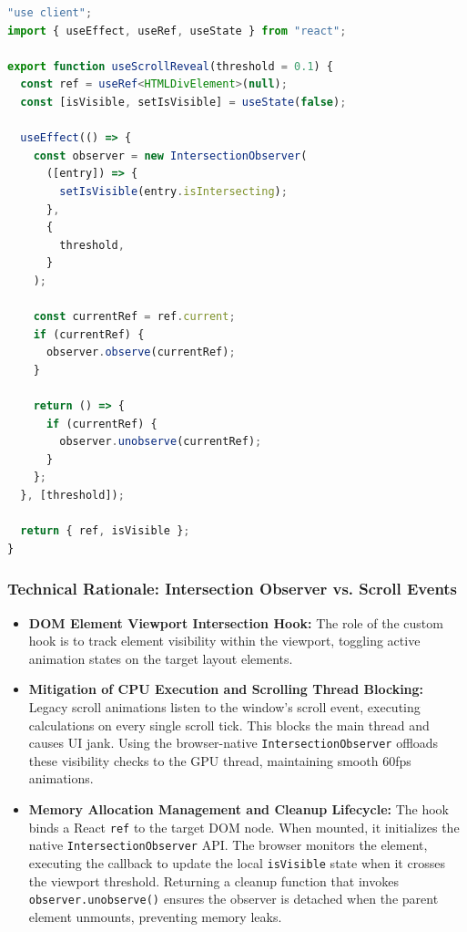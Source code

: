 \documentclass[12pt,a4paper]{article}
\begin{document}
\begin{lstlisting}[language=TypeScript,title={useScrollReveal.ts — Performance-optimized animation hook}]
"use client";
import { useEffect, useRef, useState } from "react";

export function useScrollReveal(threshold = 0.1) {
  const ref = useRef<HTMLDivElement>(null);
  const [isVisible, setIsVisible] = useState(false);

  useEffect(() => {
    const observer = new IntersectionObserver(
      ([entry]) => {
        setIsVisible(entry.isIntersecting);
      },
      {
        threshold,
      }
    );

    const currentRef = ref.current;
    if (currentRef) {
      observer.observe(currentRef);
    }

    return () => {
      if (currentRef) {
        observer.unobserve(currentRef);
      }
    };
  }, [threshold]);

  return { ref, isVisible };
}
\end{lstlisting}

\subsubsection{Technical Rationale: Intersection Observer vs. Scroll Events}

\begin{itemize}[leftmargin=2em]
    \item \textbf{DOM Element Viewport Intersection Hook:} The role of the custom hook is to track element visibility within the viewport, toggling active animation states on the target layout elements.
    \item \textbf{Mitigation of CPU Execution and Scrolling Thread Blocking:} Legacy scroll animations listen to the window's scroll event, executing calculations on every single scroll tick. This blocks the main thread and causes UI jank. Using the browser-native \texttt{IntersectionObserver} offloads these visibility checks to the GPU thread, maintaining smooth 60fps animations.
    \item \textbf{Memory Allocation Management and Cleanup Lifecycle:} The hook binds a React \texttt{ref} to the target DOM node. When mounted, it initializes the native \texttt{IntersectionObserver} API. The browser monitors the element, executing the callback to update the local \texttt{isVisible} state when it crosses the viewport threshold. Returning a cleanup function that invokes \texttt{observer.unobserve()} ensures the observer is detached when the parent element unmounts, preventing memory leaks.
\end{itemize}
\end{document}
